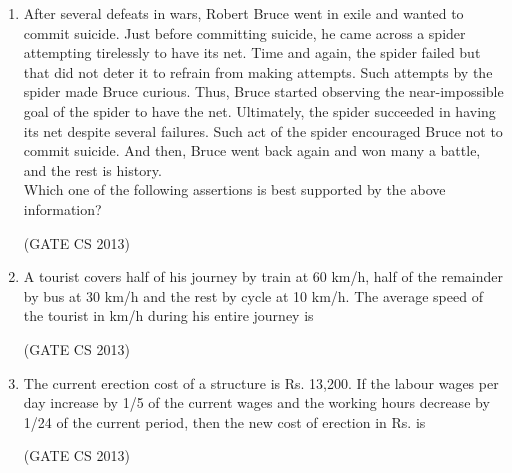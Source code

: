 \documentclass[a4paper, 11pt]{article}
\begin{document}
\begin{enumerate}
     \item After several defeats in wars, Robert Bruce went in exile and wanted to commit suicide. Just before committing suicide, he came across a spider attempting tirelessly to have its net. Time and again, the spider failed but that did not deter it to refrain from making attempts. Such attempts by the spider made Bruce curious. Thus, Bruce started observing the near-impossible goal of the spider to have the net. Ultimately, the spider succeeded in having its net despite several failures. Such act of the spider encouraged Bruce not to commit suicide. And then, Bruce went back again and won many a battle, and the rest is history.\\ Which one of the following assertions is best supported by the above information? 
     \begin{enumerate}
     \end{enumerate}

     \hfill (GATE CS 2013)

     \item A tourist covers half of his journey by train at 60 km/h, half of the remainder by bus at 30 km/h and the rest by cycle at 10 km/h. The average speed of the tourist in km/h during his entire journey is
     \begin{enumerate}
     \end{enumerate}

     \hfill (GATE CS 2013)

     \item The current erection cost of a structure is Rs. 13,200. If the labour wages per day increase by 1/5 of the current wages and the working hours decrease by 1/24 of the current period, then the new cost of erection in Rs. is 
     \begin{enumerate}
     \end{enumerate}
\hfill (GATE CS 2013)


\end{enumerate}
\end{document}
